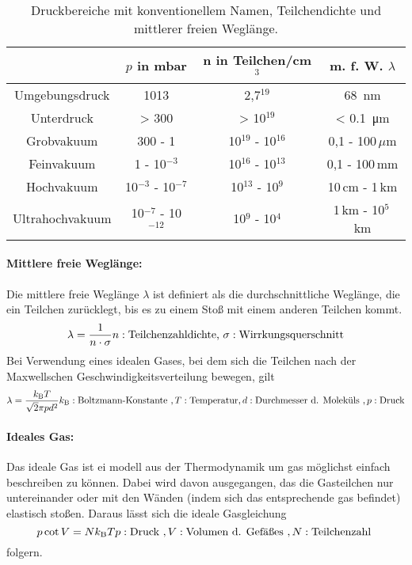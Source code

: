 \begin{table}
  \caption{Druckbereiche mit konventionellem Namen, Teilchendichte und mittlerer freien Weglänge.}
  \label{tab:Vakuum}
  \begin{tabular}{cccc}
    \toprule
    &$p$ in mbar & n in Teilchen/cm$^3$ & m. f. W. $\lambda$ \\
    \midrule
    Umgebungsdruck & 1013 & 2,7\cdot10$^{19}$ & \SI{68}{\nano\meter} \\
    Unterdruck & > 300 & > 10$^{19}$ & < \SI{0.1}{\micro\meter} \\
    Grobvakuum & 300 - 1 & 10$^{19}$ - 10$^{16}$ & 0,1 - 100$\,\mu$m \\
    Feinvakuum & 1 - 10$^{-3}$ & 10$^{16}$ - 10$^{13}$ & 0,1 - 100$\,$mm \\
    Hochvakuum & 10$^{-3}$ - 10$^{-7}$ & 10$^{13}$ - 10$^{9}$ & 10$\,$cm - 1$\,$km \\
    Ultrahochvakuum & 10$^{-7}$ - 10$^{-12}$ & 10$^{9}$ - 10$^{4}$ & 1$\,$km - 10$^5\,$km \\

  \end{tabular}

\end{table}

\paragraph{Mittlere freie Weglänge:}
Die mittlere freie Weglänge $\lambda$ ist definiert als die durchschnittliche Weglänge, die
ein Teilchen zurücklegt, bis es zu einem Stoß mit einem anderen Teilchen kommt.
\begin{equation}
  \lambda = \frac{1}{n\cdot\sigma}\\
  n:\text{Teilchenzahldichte, } \sigma:\text{Wirrkungsquerschnitt}
\end{equation}
Bei Verwendung eines idealen Gases, bei dem sich die Teilchen nach der Maxwellschen Geschwindigkeitsverteilung
bewegen, gilt
\begin{equation}
  \lambda = \frac{k_\text{B}T}{\sqrt{2}\pi p d^2}\\
  k_\text{B}:\text{Boltzmann-Konstante }, T:\text{Temperatur}, d:\text{Durchmesser d. Moleküls }, p:\text{Druck}
\end{equation}

\paragraph{Ideales Gas:}
Das ideale Gas ist ei modell aus der Thermodynamik um gas möglichst einfach beschreiben zu
können. Dabei wird davon ausgegangen, das die Gasteilchen nur untereinander oder mit den Wänden
(indem sich das entsprechende gas befindet) elastisch stoßen. Daraus lässt sich die ideale Gasgleichung
\begin{equation}
  p\cot V = Nk_\text{B}T\\
  p:\text{Druck }, V:\text{Volumen d. Gefäßes }, N:\text{Teilchenzahl }
\end{equation}
folgern.

